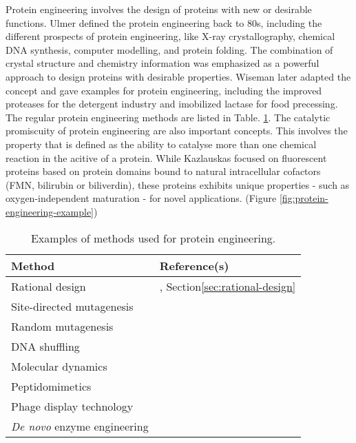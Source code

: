 \begin{refsection}
Protein engineering involves the design of proteins with new or
desirable functions. Ulmer  defined the protein engineering back
to 80s, including the different prospects of protein engineering, like X-ray
crystallography, chemical DNA synthesis, computer modelling, and protein
folding. The combination of crystal structure and chemistry information was
emphasized as a powerful approach to design proteins with desirable
properties\cite{Ulmer1983}. Wiseman  later adapted the concept
and gave examples for protein engineering, including the improved proteases for
the detergent industry\cite{Wiseman1993,Harwood1992} and imobilized lactase for
food precessing\cite{Wiseman1993}. The regular protein engineering methods are
listed in Table. \ref{tab:protein-engineering}. The catalytic promiscuity of
protein engineering are also important concepts. This involves the property
that is defined as the ability to catalyse more than one chemical reaction in
the acitive of a protein\cite{Kazlauskas2005}. While Kazlauskas 
focused on fluorescent proteins based on protein domains bound to natural
intracellular cofactors (FMN, bilirubin or biliverdin), these proteins exhibits
unique properties - such as oxygen-independent maturation - for novel
applications. (Figure \ref{fig:protein-engineering-example})
\begin{table}[h!]
    \centering
    \begin{tabular}{ ll }
        \hline
        Method & Reference(s) \\
        \hline
        
        Rational design & \cite{Arnold1993}, Section\ref{sec:rational-design} \\
        Site-directed mutagenesis & \cite{Antikainen2005a} \\
        Random mutagenesis & \cite{Wong2006, Jackson2006, Labrou2010} \\
        DNA shuffling & \cite{ Jackson2006, Antikainen2005a} \\
        Molecular dynamics & \cite{Anthonsen1994} \\
        Peptidomimetics & \cite{Venkatesan2002} \\
        Phage display technology & \cite{Sidhu2007,Chaput2008} \\
        \emph{De novo} enzyme engineering & \cite{Golynskiy2010} \\

        \hline
    \end{tabular}
    \caption[Examples of methods used for protein engineering.]{Examples of
        methods used for protein engineering\cite{Antikainen2005a}.}
        \label{tab:protein-engineering}
\end{table}


\end{refsection}
